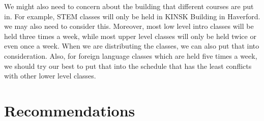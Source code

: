 \documentclass[11pt, oneside]{article}   	%
\begin{document}
We might also need to concern about the building that different courses are put in. For example, STEM classes will only be held in KINSK Building in Haverford. we may also need to consider this. Moreover, most low level intro classes will be held three times a week, while most upper level classes will only be held twice or even once a week. When we are distributing the classes, we can also put that into consideration. Also, for foreign language classes which are held five times a week, we should try our best to put that into the schedule that has the least conflicts with other lower level classes. 

\section{Recommendations}
\end{document}
